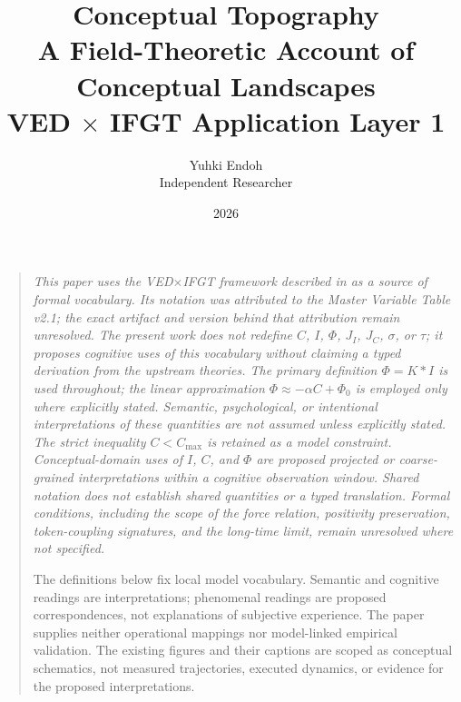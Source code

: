 \documentclass[11pt, a4paper]{article}
\newcommand{\JI}{J_{\!I}}
\newcommand{\JC}{J_{\!C}}
\newcommand{\Cmax}{C_{\max}}
\begin{document}

\title{%
  \textbf{Conceptual Topography}\\[6pt]
  {\large A Field-Theoretic Account of Conceptual Landscapes}\\[4pt]
  {\normalsize VED $\times$ IFGT Application Layer 1}
}
\author{%
  Yuhki Endoh\\
  {\small Independent Researcher}
}
\date{2026}
\maketitle

\begin{quote}
\small\itshape
This paper uses the VED$\times$IFGT framework described in
\cite{VED_vol1,VED_vol2,VED_vol3,VED_vol4,IFGT} as a source of formal vocabulary.
Its notation was attributed to the Master Variable Table v2.1; the exact
artifact and version behind that attribution remain unresolved.
The present work does not redefine $C$, $I$, $\Phi$, $\JI$, $\JC$, $\sigma$,
or $\tau$; it proposes cognitive uses of this vocabulary without claiming a
typed derivation from the upstream theories.
The primary definition $\Phi = K*I$ is used throughout;
the linear approximation $\Phi \approx -\alpha C + \Phi_0$ is employed only where
explicitly stated.
Semantic, psychological, or intentional interpretations of these quantities
are not assumed unless explicitly stated.
The strict inequality $C < \Cmax$ is retained as a model constraint.
Conceptual-domain uses of $I$, $C$, and $\Phi$ are proposed projected
or coarse-grained interpretations within a cognitive observation window.
Shared notation does not establish shared quantities or a typed translation.
Formal conditions, including the scope of the force relation, positivity
preservation, token-coupling signatures, and the long-time limit, remain
unresolved where not specified.

The definitions below fix local model vocabulary. Semantic and cognitive
readings are interpretations; phenomenal readings are proposed correspondences,
not explanations of subjective experience. The paper supplies neither
operational mappings nor model-linked empirical validation. The existing
figures and their captions are scoped as conceptual schematics, not measured
trajectories, executed dynamics, or evidence for the proposed interpretations.
\end{quote}

\vspace{4pt}


\newpage
\tableofcontents
\newpage















\end{document}
